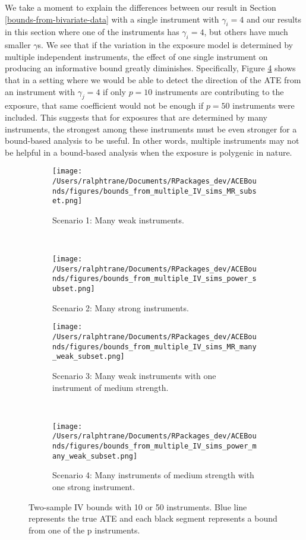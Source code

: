 \documentclass[
]{article}
\theoremstyle{plain}
\begin{document}
We take a moment to explain the differences between our result in Section \ref{bounds-from-bivariate-data} with a single instrument with \(\gamma_i = 4\) and our results in this section where one of the instruments has \(\gamma_i = 4\), but others have much smaller \(\gamma\)s. We see that if the variation in the exposure model is determined by multiple independent instruments, the effect of one single instrument on producing an informative bound greatly diminishes. Specifically, Figure \ref{fig:multiple_IVs_scenario_4} shows that in a setting where we would be able to detect the direction of the ATE from an instrument with \(\gamma_j = 4\) if only \(p = 10\) instruments are contributing to the exposure, that same coefficient would not be enough if \(p = 50\) instruments were included. This suggests that for exposures that are determined by many instruments, the strongest among these instruments must be even stronger for a bound-based analysis to be useful. In other words, multiple instruments may not be helpful in a bound-based analysis when the exposure is polygenic in nature.

\begin{figure*}
  \centering
  \begin{subfigure}[t]{0.5\textwidth}
    \texttt{[image: /Users/ralphtrane/Documents/RPackages\_dev/ACEBounds/figures/bounds\_from\_multiple\_IV\_sims\_MR\_subset.png]}
    \caption{Scenario 1: Many weak instruments.}
    \label{fig:multiple_IVs_scenario_1}
  \end{subfigure}%
  ~
  \begin{subfigure}[t]{0.5\textwidth}
    \texttt{[image: /Users/ralphtrane/Documents/RPackages\_dev/ACEBounds/figures/bounds\_from\_multiple\_IV\_sims\_power\_subset.png]}
    \caption{Scenario 2: Many strong instruments.}
    \label{fig:multiple_IVs_scenario_2}
  \end{subfigure}
  \begin{subfigure}[t]{0.5\textwidth}
    \texttt{[image: /Users/ralphtrane/Documents/RPackages\_dev/ACEBounds/figures/bounds\_from\_multiple\_IV\_sims\_MR\_many\_weak\_subset.png]}
    \caption{Scenario 3: Many weak instruments with one instrument of medium strength.}
    \label{fig:multiple_IVs_scenario_3}
  \end{subfigure}%
  ~
  \begin{subfigure}[t]{0.5\textwidth}
    \texttt{[image: /Users/ralphtrane/Documents/RPackages\_dev/ACEBounds/figures/bounds\_from\_multiple\_IV\_sims\_power\_many\_weak\_subset.png]}
    \caption{Scenario 4: Many instruments of medium strength with one strong instrument.}
    \label{fig:multiple_IVs_scenario_4}
  \end{subfigure}
  \caption{Two-sample IV bounds with 10 or 50 instruments. Blue line represents the true ATE and each black segment represents a bound from one of the p instruments.}
  \label{fig:multiple_IVs}
\end{figure*}
\end{document}
